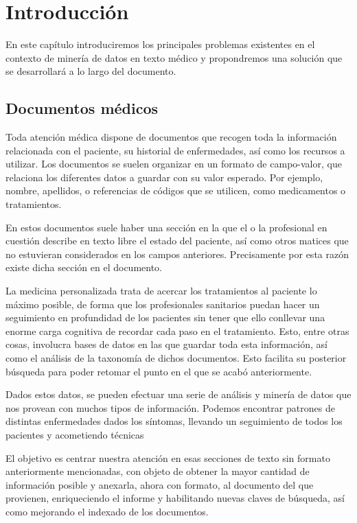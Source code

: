 \chapter{Introducción}

En este capítulo introduciremos los principales problemas existentes en el contexto de minería de datos en texto médico y propondremos una solución que se desarrollará a lo largo del documento.

\section{Documentos médicos}

Toda atención médica dispone de documentos que recogen toda la información relacionada con el paciente, su historial de enfermedades, así como los recursos a utilizar. Los documentos se suelen organizar en un formato de campo-valor, que relaciona los diferentes datos a guardar con su valor esperado. Por ejemplo, nombre, apellidos, o referencias de códigos que se utilicen, como medicamentos o tratamientos.

En estos documentos suele haber una sección en la que el o la profesional en cuestión describe en texto libre el estado del paciente, así como otros matices que no estuvieran considerados en los campos anteriores. Precisamente por esta razón existe dicha sección en el documento.

La medicina personalizada trata de acercar los tratamientos al paciente lo máximo posible, de forma que los profesionales sanitarios puedan hacer un seguimiento en profundidad de los pacientes sin tener que ello conllevar una enorme carga cognitiva de recordar cada paso en el tratamiento. Esto, entre otras cosas, involucra bases de datos en las que guardar toda esta información, así como el análisis de la taxonomía de dichos documentos. Esto facilita su posterior búsqueda para poder retomar el punto en el que se acabó anteriormente.

Dados estos datos, se pueden efectuar una serie de análisis y minería de datos que nos provean con muchos tipos de información. Podemos encontrar patrones de distintas enfermedades dados los síntomas, llevando un seguimiento de todos los pacientes y acometiendo técnicas 

El objetivo es centrar nuestra atención en esas secciones de texto sin formato anteriormente mencionadas, con objeto de obtener la mayor cantidad de información posible y anexarla, ahora con formato, al documento del que provienen, enriqueciendo el informe y habilitando nuevas claves de búsqueda, así como mejorando el indexado de los documentos.

